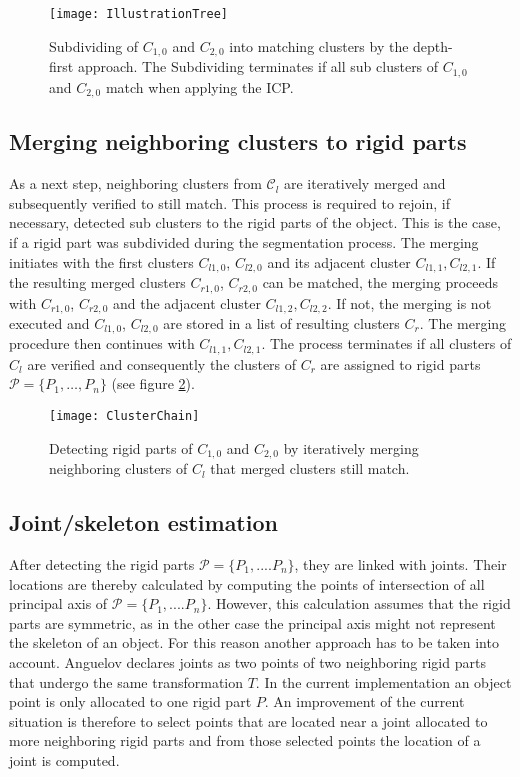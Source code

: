 \begin{figure}
	\centering
	\texttt{[image: IllustrationTree]}
	\caption{Subdividing of $C_{1,0}$ and $C_{2,0}$ into matching clusters by the depth-first approach. The Subdividing terminates if all sub clusters of $C_{1,0}$ and $C_{2,0}$ match when applying the ICP.}
	\label{fig:illustrationTree}
\end{figure}

\subsection{Merging neighboring clusters to rigid parts}

As a next step, neighboring clusters from $\mathcal{C}_l$ are iteratively merged and subsequently verified to still match. This process is required to rejoin, if necessary, detected sub clusters to the rigid parts of the object. This is the case, if a rigid part was subdivided during the segmentation process. The merging initiates with the first clusters $C_{l1,0}$, $C_{l2,0}$ and its adjacent cluster $C_{l1,1},C_{l2,1}$. If the resulting merged clusters $C_{r1,0}$, $C_{r2,0}$ can be matched, the merging proceeds with $C_{r1,0}$, $C_{r2,0}$ and the adjacent cluster $C_{l1,2},C_{l2,2}$. If not, the merging is not executed and $C_{l1,0}$, $C_{l2,0}$ are stored in a list of resulting clusters $C_r$. The merging procedure then continues with $C_{l1,1},C_{l2,1}$. The process terminates if all clusters of $C_l$ are verified and consequently the clusters of $C_r$ are assigned to rigid parts $ \mathcal{P} =  \{P_1,\ldots,P_n\}$ (see figure \ref{fig:clusterChain}). 

\begin{figure}
	\centering
	\texttt{[image: ClusterChain]}
	\caption{Detecting rigid parts of $C_{1,0}$ and $C_{2,0}$ by iteratively merging neighboring clusters of $C_l$ that merged clusters still match.}
	\label{fig:clusterChain}
\end{figure}

\subsection{Joint/skeleton estimation}

After detecting the rigid parts $\mathcal{P} =  \{ {P_1,....P_n}\}$, they are linked with joints. Their locations are thereby calculated by computing the points of intersection of all principal axis of $\mathcal{P} =  \{ {P_1,....P_n}\}$. However, this calculation assumes that the rigid parts are symmetric, as in the other case the principal axis might not represent the skeleton of an object. For this reason another approach has to be taken into account. Anguelov \cite{Anguelov04} declares joints as two points of two neighboring rigid parts that undergo the same transformation $T$. In the current implementation an object point is only allocated to one rigid part $P$. An improvement of the current situation is therefore to select points that are located near a joint allocated to more neighboring rigid parts and from those selected points the location of a joint is computed. 


